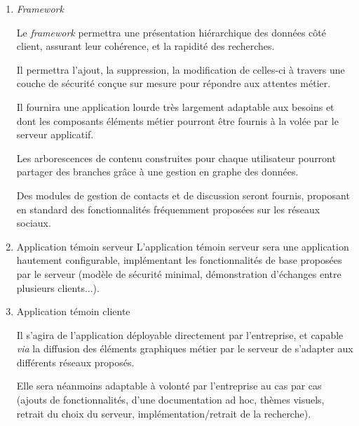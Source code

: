 \begin{enumerate}

 \item \textit{Framework}

Le \textit{framework} permettra une présentation hiérarchique des données côté client, assurant leur cohérence, et la rapidité des recherches.

Il permettra l'ajout, la suppression, la modification de celles-ci à travers une couche de sécurité conçue sur mesure pour répondre aux attentes métier.

Il fournira une application lourde très largement adaptable aux besoins et dont les composants éléments métier pourront être fournis à la volée par le serveur applicatif.

Les arborescences de contenu construites pour chaque utilisateur pourront partager des branches grâce à une gestion en graphe des données.

Des modules de gestion de contacts et de discussion seront fournis, proposant en standard des fonctionnalités fréquemment proposées sur les réseaux sociaux.

 \item Application témoin serveur
L'application témoin serveur sera une application hautement configurable, implémentant les fonctionnalités de base proposées par le serveur (modèle de sécurité minimal, démonstration d'échanges entre plusieurs clients...).

 \item Application témoin cliente

Il s'agira de l'application déployable directement par l'entreprise, et capable \emph{via} la diffusion des éléments graphiques métier par le serveur de s'adapter aux différents réseaux proposés.

Elle sera néanmoins adaptable à volonté par l'entreprise au cas par cas (ajouts de fonctionnalités, d'une documentation ad hoc, thèmes visuels, retrait du choix du serveur, implémentation/retrait de la recherche).

\end{enumerate}